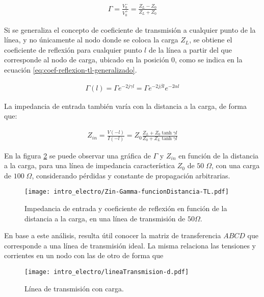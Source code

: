 \begin{align}
	\label{eq:coef-reflexion-tl}
	\Gamma = \frac{V_0^-}{V_0^+} = \frac{Z_L-Z_0}{Z_L+Z_0}
\end{align}

Si se generaliza el concepto de coeficiente de transmisión a cualquier punto de la línea, y no únicamente al nodo donde se coloca la carga $Z_L$, se obtiene el coeficiente de reflexión para cualquier punto $l$ de la línea a partir del que corresponde al nodo de carga, ubicado en la posición 0, como se indica en la ecuación \ref{eq:coef-reflexion-tl-generalizado}.

\begin{align}
\label{eq:coef-reflexion-tl-generalizado}
\Gamma(l) = \Gamma e^{-2j\gamma l} = \Gamma e^{-2j\beta l} e^{-2\alpha l}
\end{align}

La impedancia de entrada también varía con la distancia a la carga, de forma que:

\begin{align}
Z_{in} = \frac{V(-l)}{I(-l)} = Z_0 \frac{Z_L +Z_0 \tanh \gamma l}{Z_0 + Z_L \tanh \gamma l}
\end{align}

En la figura \ref{fig:Zin-Gamma-funcionDistancia-TL} se puede observar una gráfica de $\Gamma$ y $Z_{in}$ en función de la distancia a la carga, para una línea de impedancia característica $Z_0$ de $50 \; \Omega$, con una carga de $100 \; \Omega$, considerando pérdidas y constante de propagación arbitrarias.

\begin{figure}[htp]
	\centering
	\texttt{[image: intro\_electro/Zin-Gamma-funcionDistancia-TL.pdf]}
	\caption{Impedancia de entrada y coeficiente de reflexión en función de la distancia a la carga, en una línea de transmisión de $50 \Omega$.}
	\label{fig:Zin-Gamma-funcionDistancia-TL}
\end{figure}

En base a este análisis, resulta útil conocer la matriz de transferencia $ABCD$ que corresponde a una línea de transmisión ideal. La misma relaciona las tensiones y corrientes en un nodo con las de otro de forma que

\begin{figure}[htp]
	\centering
	\texttt{[image: intro\_electro/lineaTransmision-d.pdf]}
	\caption{Línea de transmisión con carga.}
	\label{fig:Zin-Gamma-funcionDistancia-TL}
\end{figure}

